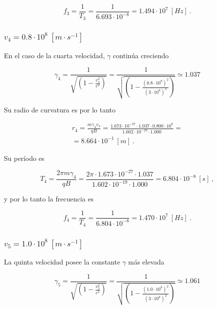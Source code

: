 \documentclass[journal]{IEEEtran}
\begin{document}
\begin{equation}
f_3 = \displaystyle\frac{1}{T_3} = \displaystyle\frac{1}{6.693\cdot 10^{-8}} = 1.494\cdot 10^7~[Hz]~.
\end{equation}

\subsubsection{$v_4 = 0.8\cdot 10^8~[m\cdot s^{-1}]$}

En el caso de la cuarta velocidad, $\gamma$ continúa creciendo

\begin{equation}
\gamma_4 = \displaystyle\frac{1}{\sqrt{(1-\displaystyle\frac{v_4^2}{c^2})}} = \displaystyle\frac{1}{\sqrt{(1-\displaystyle\frac{(0.8\cdot 10^8)^2}{(3\cdot 10^8)^2})}} \simeq 1.037
\end{equation}

Su radio de curvatura es por lo tanto

\begin{align}
r_4 = \displaystyle\frac{m\gamma_4v_4}{qB} = \displaystyle\frac{1.673\cdot 10^{-27}\cdot 1.037 \cdot 0.800\cdot 10^8}{1.602\cdot 10^{-19}\cdot 1.000} = \\
= 8.664\cdot 10^{-1}~[m]~.
\end{align}

Su período es

\begin{equation}
T_4 = \displaystyle\frac{2\pi m\gamma_4}{qB} = \displaystyle\frac{2\pi \cdot 1.673\cdot 10^{-27}\cdot 1.037}{1.602\cdot 10^{-19}\cdot 1.000} = 6.804\cdot 10^{-8}~[s]~,
\end{equation}

y por lo tanto la frecuencia es

\begin{equation}
f_4 = \displaystyle\frac{1}{T_4} = \displaystyle\frac{1}{6.804\cdot 10^{-8}} = 1.470\cdot 10^7~[Hz]~.
\end{equation}

\subsubsection{$v_5 = 1.0\cdot 10^8~[m\cdot s^{-1}]$}

La quinta velocidad posee la constante $\gamma$ más elevada

\begin{equation}
\gamma_5 = \displaystyle\frac{1}{\sqrt{(1-\displaystyle\frac{v_5^2}{c^2})}} = \displaystyle\frac{1}{\sqrt{(1-\displaystyle\frac{(1.0\cdot 10^8)^2}{(3\cdot 10^8)^2})}} \simeq 1.061
\end{equation}
\end{document}
